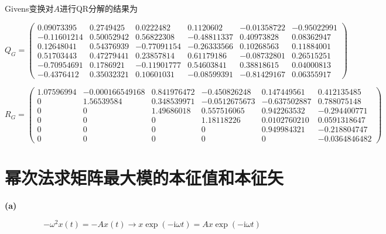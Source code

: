 \documentclass[UTF8]{ctexart}
\begin{document}
Givens变换对$A$进行QR分解的结果为

\begin{equation}\label{1-d-4}
    Q_G=\left(
        \begin{array}{cccccc}
            0.09073395 & 0.2749425  & 0.0222482  & 0.1120602 & -0.01358722 & -0.95022991\\
            -0.11601214 & 0.50052942 & 0.56822308 & -0.48811337 & 0.40973828 & 0.08362947\\
             0.12648041 & 0.54376939 &-0.77091154 &-0.26333566 & 0.10268563 & 0.11884001\\
             0.51703443 & 0.47279441 & 0.23857814 & 0.61179186 &-0.08732801 & 0.26515251\\
            -0.70954691 & 0.1786921 & -0.11901777 & 0.54603841 & 0.38818615 & 0.04000813\\
            -0.4376412  & 0.35032321 & 0.10601031 &-0.08599391 &-0.81429167 & 0.06355917
        \end{array}
    \right)
\end{equation}

\begin{equation}\label{1-d-5}
    R_G=\left(
        \begin{array}{cccccc}
            1.07596994 & -0.000166549168 & 0.841976472 & -0.450826248 & 0.147449561 & 0.412135485\\
            0 & 1.56539584 & 0.348539971 & -0.0512675673 & -0.637502887 & 0.788075148\\
            0 & 0 & 1.49686018 & 0.557516065 & 0.942263532 & -0.294400771\\
            0 & 0 & 0 & 1.18118226 & 0.0102760210 & 0.0591318647\\
            0 & 0 & 0 & 0 & 0.949984321 & -0.218804747\\
            0 & 0 & 0 & 0 & 0 & -0.0364846482
        \end{array}
    \right)
\end{equation}

\section{幂次法求矩阵最大模的本征值和本征矢}

\noindent\textbf{(a)}

\begin{equation}\label{2-a-1}
    -\omega^2x(t)=-Ax(t)\rightarrow x\exp(-\mathrm{i}\omega t)=Ax\exp(-\mathrm{i}\omega t)
\end{equation}
\end{document}
